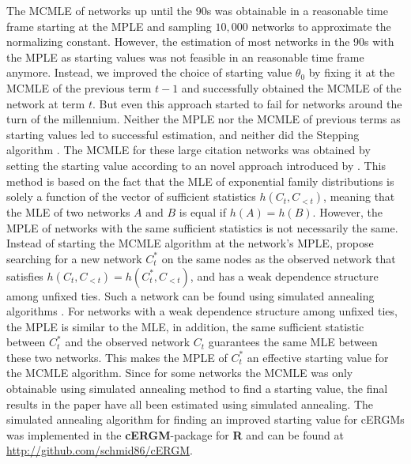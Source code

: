 \documentclass[headsepline=true, abstracton]{scrartcl}
\begin{document}
The MCMLE of networks up until the 90s was obtainable in a reasonable time frame starting at the MPLE and sampling $10,000$ networks to approximate the normalizing constant. However, the estimation of most networks in the 90s with the MPLE as starting values was not feasible in an reasonable time frame anymore. Instead, we improved the choice of starting value $\theta_0$ by fixing it at the MCMLE of the previous term $t-1$ and successfully obtained the MCMLE of the network at term $t$. But even this approach started to fail for networks around the turn of the millennium. Neither the MPLE nor the MCMLE of previous terms as starting values led to successful estimation, and neither did the Stepping algorithm \citep{hummel2012improving}. 
The MCMLE for these large citation networks was obtained by setting the starting value according to an novel approach introduced by \citet{SchmidHunter2020}. This method is based on the fact that the MLE of exponential family distributions is solely a function of the vector of sufficient statistics $h(C_t, C_{<t})$, meaning that the MLE of two networks $A$ and $B$ is equal if $h(A)=h(B)$. However, the MPLE of networks with the same sufficient statistics is not necessarily the same. Instead of starting the MCMLE algorithm at the network's MPLE, \citet{SchmidHunter2020} propose searching for a new network $C_t^*$ on the same nodes as the observed network that satisfies $h(C_t, C_{<t}) = h(C_t^*, C_{<t})$, and has a weak dependence structure among unfixed ties. Such a network can be found using simulated annealing algorithms \citep{Kirkpatrick83}. For networks with a weak dependence structure among unfixed ties, the MPLE is similar to the MLE, in addition, the same sufficient statistic between $C_t^*$ and the observed network $C_t$ guarantees the same MLE between these two networks. This makes the MPLE of $C_t^*$ an effective starting value for the MCMLE algorithm. Since for some networks the MCMLE was only obtainable using simulated annealing method to find a starting value, the final results in the paper have all been estimated using simulated annealing.
The simulated annealing algorithm for finding an improved starting value for cERGMs was implemented in the \textbf{cERGM}-package for \textbf{R} \citep{RCore} and can be found at \url{http://github.com/schmid86/cERGM}.
\end{document}
